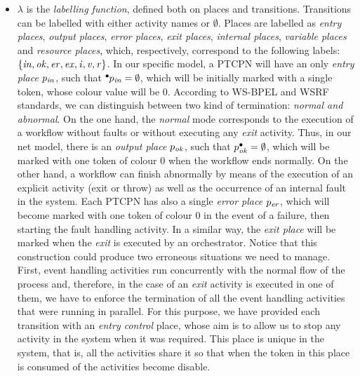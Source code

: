 \begin{definition} 
\begin{itemize}
%
\item $\lambda$ is the {\em labelling function}, defined
both on places and transitions.
%
Transitions can be labelled with either activity names
or $\emptyset$. 
%
Places are labelled as
{\em entry places}, {\em output places}, {\em error places}, {\em exit places}, 
{\em internal places}, {\em variable places} and
{\em resource places},
which, respectively, correspond to the following labels:
$\{{\it in, ok, er, ex, i, v, r}\}$. In our specific model, a 
PTCPN will have an only {\em entry place} $p_{\it in}$, 
such that $\hspace*{-0.4em}~^{\bullet} \hspace*{-0.05em}p_{\it in} = \emptyset$,
which will be
initially marked with a single token, whose colour value will be $0$.
According to WS-BPEL and WSRF standards,
we can distinguish between two kind of termination: \emph{normal and abnormal}. On the one hand, the \emph{normal} mode
corresponds to the execution of a workflow without faults or without executing any \emph{exit} activity. Thus, in our net model, there is 
an {\em output place} $p_{\it ok}$, such that
$p^{\bullet}_{\it ok}=\emptyset$, which will be marked with 
one token of colour $0$ when the workflow ends normally. On the other hand, a workflow can finish abnormally by means of the execution of an explicit activity (exit or throw) as well as
the occurrence of an internal fault in the system. Each PTCPN has also a single {\em error place} $p_{\it er}$, 
which will become marked
with one token of colour $0$ in the event of a failure, then starting the fault handling activity.
In a similar way, the {\em exit place} will be marked when the {\em exit} is executed by an
orchestrator. Notice that this construction 
could produce two erroneous situations we need to manage. First, 
event handling activities run concurrently with the normal flow of the process and, therefore,  
in the case of an {\em exit} activity is executed in one of them, we have to enforce the termination of all the event handling activities
that were running in parallel.
For this purpose, we have provided each transition
with an {\em entry control} place, whose aim is to allow us to stop any activity in the system when it was required. This place is unique in the system, 
that is, all the activities share it so that when the token in this place is consumed of the activities become disable.


\end{itemize}
\end{definition}
